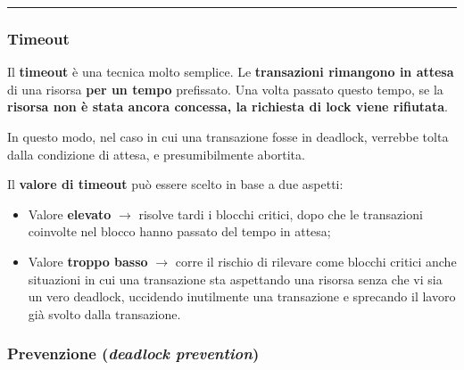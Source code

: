 \documentclass[a4paper]{article}
\newcommand{\longline}{\noindent\rule{\textwidth}{0.4pt}}
\begin{document}
	\longline
	
	\subsubsection{Timeout}
	
	Il \textcolor{Red3}{\textbf{timeout}} è una tecnica molto semplice. Le \textbf{transazioni rimangono in attesa} di una risorsa \textbf{per un tempo} prefissato. Una volta passato questo tempo, se la \textbf{risorsa non è stata ancora concessa, la richiesta di lock viene rifiutata}.\newline
	
	\noindent
	In questo modo, nel caso in cui una transazione fosse in deadlock, verrebbe tolta dalla condizione di attesa, e presumibilmente abortita.\newline
	
	\noindent
	Il \textbf{valore di timeout} può essere scelto in base a due aspetti:
	\begin{itemize}
		\item Valore \textbf{elevato} $\rightarrow$ risolve tardi i blocchi critici, dopo che le transazioni coinvolte nel blocco hanno passato del tempo in attesa;
		
		\item Valore \textbf{troppo basso} $\rightarrow$ corre il rischio di rilevare come blocchi critici anche situazioni in cui una transazione sta aspettando una risorsa senza che vi sia un vero deadlock, uccidendo inutilmente una transazione e sprecando il lavoro già svolto dalla transazione.
	\end{itemize}\newpage

	\subsubsection{Prevenzione (\emph{deadlock prevention})}
	
\end{document}
